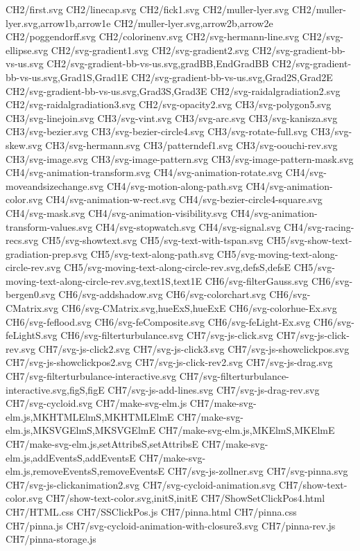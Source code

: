 CH2/first.svg
CH2/linecap.svg
CH2/fick1.svg
CH2/muller-lyer.svg
CH2/muller-lyer.svg,arrow1b,arrow1e
CH2/muller-lyer.svg,arrow2b,arrow2e
CH2/poggendorff.svg
CH2/colorinenv.svg
CH2/svg-hermann-line.svg
CH2/svg-ellipse.svg
CH2/svg-gradient1.svg
CH2/svg-gradient2.svg
CH2/svg-gradient-bb-vs-us.svg
CH2/svg-gradient-bb-vs-us.svg,gradBB,EndGradBB
CH2/svg-gradient-bb-vs-us.svg,Grad1S,Grad1E
CH2/svg-gradient-bb-vs-us.svg,Grad2S,Grad2E
CH2/svg-gradient-bb-vs-us.svg,Grad3S,Grad3E
CH2/svg-raidalgradiation2.svg
CH2/svg-raidalgradiation3.svg
CH2/svg-opacity2.svg
CH3/svg-polygon5.svg
CH3/svg-linejoin.svg
CH3/svg-vint.svg
CH3/svg-arc.svg
CH3/svg-kanisza.svg
CH3/svg-bezier.svg
CH3/svg-bezier-circle4.svg
CH3/svg-rotate-full.svg
CH3/svg-skew.svg
CH3/svg-hermann.svg
CH3/patterndef1.svg
CH3/svg-oouchi-rev.svg
CH3/svg-image.svg
CH3/svg-image-pattern.svg
CH3/svg-image-pattern-mask.svg
CH4/svg-animation-transform.svg
CH4/svg-animation-rotate.svg
CH4/svg-moveandsizechange.svg
CH4/svg-motion-along-path.svg
CH4/svg-animation-color.svg
CH4/svg-animation-w-rect.svg
CH4/svg-bezier-circle4-square.svg
CH4/svg-mask.svg
CH4/svg-animation-visibility.svg
CH4/svg-animation-transform-values.svg
CH4/svg-stopwatch.svg
CH4/svg-signal.svg
CH4/svg-racing-recs.svg
CH5/svg-showtext.svg
CH5/svg-text-with-tspan.svg
CH5/svg-show-text-gradiation-prep.svg
CH5/svg-text-along-path.svg
CH5/svg-moving-text-along-circle-rev.svg
CH5/svg-moving-text-along-circle-rev.svg,defsS,defsE
CH5/svg-moving-text-along-circle-rev.svg,text1S,text1E
CH6/svg-filterGauss.svg
CH6/svg-bergen0.svg
CH6/svg-addshadow.svg
CH6/svg-colorchart.svg
CH6/svg-CMatrix.svg
CH6/svg-CMatrix.svg,hueExS,hueExE
CH6/svg-colorhue-Ex.svg
CH6/svg-feflood.svg
CH6/svg-feComposite.svg
CH6/svg-feLight-Ex.svg
CH6/svg-feLightS.svg
CH6/svg-filterturbulance.svg
CH7/svg-js-click.svg
CH7/svg-js-click-rev.svg
CH7/svg-js-click2.svg
CH7/svg-js-click3.svg
CH7/svg-js-showclickpos.svg
CH7/svg-js-showclickpos2.svg
CH7/svg-js-click-rev2.svg
CH7/svg-js-drag.svg
CH7/svg-filterturbulance-interactive.svg
CH7/svg-filterturbulance-interactive.svg,figS,figE
CH7/svg-js-add-lines.svg
CH7/svg-js-drag-rev.svg
CH7/svg-cycloid.svg
CH7/make-svg-elm.js
CH7/make-svg-elm.js,MKHTMLElmS,MKHTMLElmE
CH7/make-svg-elm.js,MKSVGElmS,MKSVGElmE
CH7/make-svg-elm.js,MKElmS,MKElmE
CH7/make-svg-elm.js,setAttribsS,setAttribsE
CH7/make-svg-elm.js,addEventsS,addEventsE
CH7/make-svg-elm.js,removeEventsS,removeEventsE
CH7/svg-js-zollner.svg
CH7/svg-pinna.svg
CH7/svg-js-clickanimation2.svg
CH7/svg-cycloid-animation.svg
CH7/show-text-color.svg
CH7/show-text-color.svg,initS,initE
CH7/ShowSetClickPos4.html
CH7/HTML.css
CH7/SSClickPos.js
CH7/pinna.html
CH7/pinna.css
CH7/pinna.js
CH7/svg-cycloid-animation-with-closure3.svg
CH7/pinna-rev.js
CH7/pinna-storage.js
